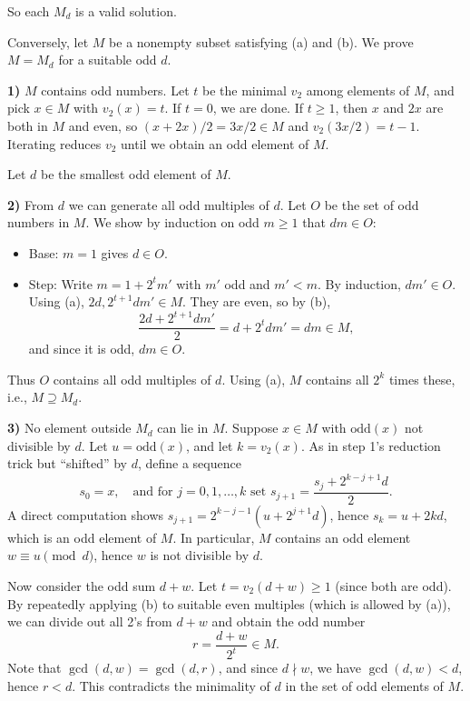 \documentclass[12pt,a4paper]{article}
\theoremstyle{definition}
\begin{document}
    So each $M_d$ is a valid solution.

    Conversely, let $M$ be a nonempty subset satisfying (a) and (b). We prove $M = M_d$ for a suitable odd $d$.

    \textbf{1)} $M$ contains odd numbers. Let $t$ be the minimal $v_2$ among elements of $M$, and pick $x \in M$ with $v_2(x) = t$. If $t = 0$, we are done. If $t \geq 1$, then $x$ and $2x$ are both in $M$ and even, so $(x+2x)/2 = 3x/2 \in M$ and $v_2(3x/2) = t-1$. Iterating reduces $v_2$ until we obtain an odd element of $M$.

    Let $d$ be the smallest odd element of $M$.

    \textbf{2)} From $d$ we can generate all odd multiples of $d$. Let $O$ be the set of odd numbers in $M$. We show by induction on odd $m \geq 1$ that $dm \in O$:
    \begin{itemize}
        \item Base: $m = 1$ gives $d \in O$.
        \item Step: Write $m = 1 + 2^t m'$ with $m'$ odd and $m' < m$. By induction, $dm' \in O$. Using (a), $2d, 2^{t+1} dm' \in M$. They are even, so by (b),
        $$\frac{2d + 2^{t+1} dm'}{2} = d + 2^t dm' = dm \in M,$$
        and since it is odd, $dm \in O$.
    \end{itemize}

    Thus $O$ contains all odd multiples of $d$. Using (a), $M$ contains all $2^k$ times these, i.e., $M \supseteq M_d$.

    \textbf{3)} No element outside $M_d$ can lie in $M$. Suppose $x \in M$ with $\text{odd}(x)$ not divisible by $d$. Let $u = \text{odd}(x)$, and let $k = v_2(x)$. As in step 1's reduction trick but ``shifted'' by $d$, define a sequence
    $$s_0 = x, \quad \text{and for } j = 0,1,\ldots,k \text{ set } s_{j+1} = \frac{s_j + 2^{k-j+1} d}{2}.$$
    A direct computation shows $s_{j+1} = 2^{k-j-1} (u + 2^{j+1} d)$, hence $s_k = u + 2kd$, which is an odd element of $M$. In particular, $M$ contains an odd element $w \equiv u \pmod{d}$, hence $w$ is not divisible by $d$.

    Now consider the odd sum $d + w$. Let $t = v_2(d + w) \geq 1$ (since both are odd). By repeatedly applying (b) to suitable even multiples (which is allowed by (a)), we can divide out all 2's from $d + w$ and obtain the odd number
    $$r = \frac{d + w}{2^t} \in M.$$
    Note that $\gcd(d, w) = \gcd(d, r)$, and since $d \nmid w$, we have $\gcd(d, w) < d$, hence $r < d$. This contradicts the minimality of $d$ in the set of odd elements of $M$.
\end{document}
